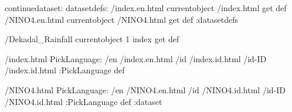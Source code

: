\begin{ingrid}
continuedataset:
datasetdefs:
/index.en.html currentobject /index.html get def
/NINO4.en.html currentobject /NINO4.html get def
:datasetdefs

/Dekadal_Rainfall currentobject 1 index get def

/index.html {
PickLanguage:
/en /index.en.html
/id /index.id.html
/id-ID /index.id.html
:PickLanguage
} def

/NINO4.html {
PickLanguage:
/en /NINO4.en.html
/id /NINO4.id.html
/id-ID /NINO4.id.html
:PickLanguage
} def
:dataset
\end{ingrid}
